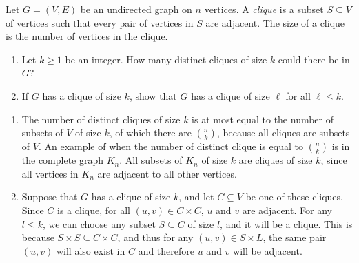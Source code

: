 \documentclass{article}
\begin{document}
\begin{question}
Let $G = (V, E)$ be an undirected graph on $n$ vertices. A {\em clique} is a subset $S \subseteq V$ of vertices such that every pair of vertices in $S$ are adjacent. The size of a clique is the number of vertices in the clique.

\begin{enumerate}[label = (\alph*)]
    \item Let $k \geq 1$ be an integer. How many distinct cliques of size $k$ could there be in $G$?

    \item If $G$ has a clique of size $k$, show that $G$ has a clique of size $\ell$ for all $\ell \leq k$.
\end{enumerate}
\end{question}

\begin{solution}
\begin{enumerate}[label = (\alph*)]
    \item The number of distinct cliques of size $k$ is at most equal to the number of subsets of $V$ of size $k$, of which there are $\binom{n}{k}$, 
    because all cliques are subsets of $V$. An example of when the number of distinct clique is equal to 
    $\binom{n}{k}$ is in the complete graph $K_n$. 
    All subsets of $K_n$ of size $k$ are cliques of size $k$, since all vertices in $K_n$ are adjacent to all other vertices.


    \item Suppose that $G$ has a clique of size $k$, and let $C\subseteq V$ be one of these cliques.
    Since $C$ is a clique, for all $(u, v)\in C\times C$, $u$ and $v$ are adjacent. For any $l\leq k$, we can 
    choose any subset $S\subseteq C$ of size $l$, and it will be a clique. This is because $S\times S\subseteq C\times C$, 
    and thus for any $(u, v)\in S\times L$, the same pair $(u,v)$ will also exist in $C$ and therefore $u$ and $v$ will be adjacent.

\end{enumerate}
\end{solution}
\end{document}
